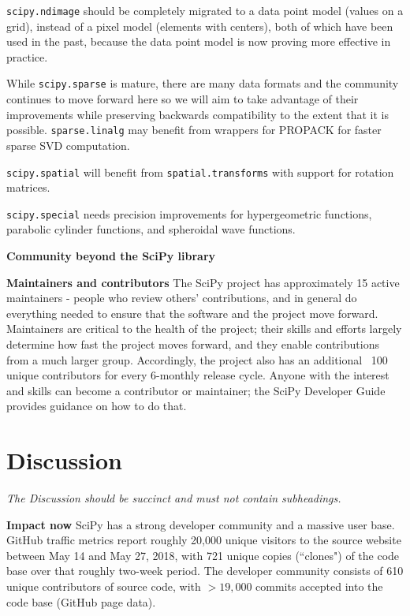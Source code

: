 \documentclass[fleqn,10pt]{wlscirep}
\begin{document}
\texttt{scipy.ndimage} should be completely migrated to a data point
model (values on a grid), instead of a pixel model (elements with centers),
both of which have been used in the past, because the data point model is now
proving more effective in practice.

While \texttt{scipy.sparse} is mature, there are many data
formats and the community continues to move forward here so we will aim
to take advantage of their improvements\cite{abbasi2018sparse} 
while preserving backwards compatibility to the extent that it is possible.
\texttt{sparse.linalg} may benefit from wrappers for PROPACK 
for faster sparse SVD computation.

\texttt{scipy.spatial} will benefit from \texttt{spatial.transforms} with
support for rotation matrices.

\texttt{scipy.special} needs precision improvements for hypergeometric 
functions, parabolic cylinder functions, and spheroidal wave functions.




\textbf{Community beyond the SciPy library}

\textbf{Maintainers and contributors}
The SciPy project has approximately 15 active maintainers - people who review
others' contributions, and in general do everything needed to ensure that
the software and the project move forward. Maintainers are critical to the
health of the project\cite{eghbal2016}; their skills and efforts largely
determine how fast the project moves forward, and they enable contributions
from a much larger group. Accordingly, the project also has an additional
~100 unique contributors for every 6-monthly release cycle. Anyone with the
interest and skills can become a contributor or maintainer; the SciPy
Developer Guide provides guidance on how to do that.

\section*{Discussion}

\textit{The Discussion should be succinct and must not contain subheadings.}

\textbf{Impact now}
SciPy has a strong developer community and a massive user base. GitHub
traffic metrics report roughly 20,000 unique visitors to the source
website between May 14 and May 27, 2018, with 721 unique copies (``clones")
of the code base over that roughly two-week period. The developer community
consists of 610 unique contributors of source code, with $>19,000$ commits
accepted into the code base (GitHub page data).
\end{document}
